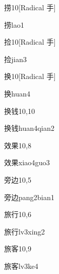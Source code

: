 \begin{entry}{捞}{10}[Radical 手]
  \begin{phonetics}{捞}{lao1}
  \end{phonetics}
\end{entry}

\begin{entry}{捡}{10}[Radical 手]
  \begin{phonetics}{捡}{jian3}
  \end{phonetics}
\end{entry}

\begin{entry}{换}{10}[Radical 手]
  \begin{phonetics}{换}{huan4}
  \end{phonetics}
\end{entry}

\begin{entry}{换钱}{10,10}
  \begin{phonetics}{换钱}{huan4qian2}
  \end{phonetics}
\end{entry}

\begin{entry}{效果}{10,8}
  \begin{phonetics}{效果}{xiao4guo3}
  \end{phonetics}
\end{entry}

\begin{entry}{旁边}{10,5}
  \begin{phonetics}{旁边}{pang2bian1}
  \end{phonetics}
\end{entry}

\begin{entry}{旅行}{10,6}
  \begin{phonetics}{旅行}{lv3xing2}
  \end{phonetics}
\end{entry}

\begin{entry}{旅客}{10,9}
  \begin{phonetics}{旅客}{lv3ke4}
  \end{phonetics}
\end{entry}

